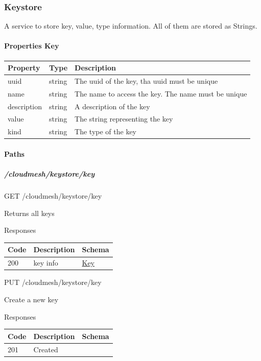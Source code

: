 \documentclass[9pt,]{article}
\let\oldparagraph\paragraph
\renewcommand{\paragraph}[1]{\oldparagraph{#1}\mbox{}}
\let\oldsubparagraph\subparagraph
\renewcommand{\subparagraph}[1]{\oldsubparagraph{#1}\mbox{}}
\begin{document}
\hypertarget{keystore}{%
\subsubsection{Keystore}\label{keystore}}

A service to store key, value, type information. All of them are stored
as Strings.

\hypertarget{properties-key}{%
\paragraph{Properties Key}\label{properties-key}}

\begin{longtable}[]{@{}lll@{}}
\toprule
Property & Type & Description\tabularnewline
\midrule
\endhead
uuid & string & The uuid of the key, tha uuid must be
unique\tabularnewline
name & string & The name to access the key. The name must be
unique\tabularnewline
description & string & A description of the key\tabularnewline
value & string & The string representing the key\tabularnewline
kind & string & The type of the key\tabularnewline
\bottomrule
\end{longtable}

\hypertarget{paths-2}{%
\paragraph{Paths}\label{paths-2}}

\hypertarget{cloudmeshkeystorekey}{%
\subparagraph{/cloudmesh/keystore/key}\label{cloudmeshkeystorekey}}

GET /cloudmesh/keystore/key

Returns all keys

Responses

\begin{longtable}[]{@{}lll@{}}
\toprule
Code & Description & Schema\tabularnewline
\midrule
\endhead
200 & key info & \protect\hyperlink{key}{Key}\tabularnewline
\bottomrule
\end{longtable}

PUT /cloudmesh/keystore/key

Create a new key

Responses

\begin{longtable}[]{@{}lll@{}}
\toprule
Code & Description & Schema\tabularnewline
\midrule
\endhead
201 & Created &\tabularnewline
\bottomrule
\end{longtable}
\end{document}
